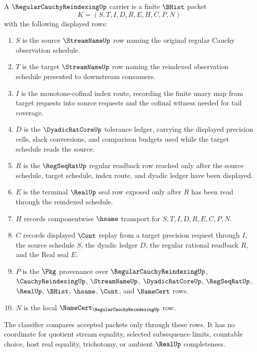 \begin{definition}
\label{def:regular-cauchy-reindexing-carrier}
A $\RegularCauchyReindexingUp$ carrier is a finite $\BHist$ packet
$$
K=(S,T,I,D,R,E,H,C,P,N)
$$
with the following displayed rows:
\begin{enumerate}
\item $S$ is the source $\StreamNameUp$ row naming the original regular Cauchy observation schedule.
\item $T$ is the target $\StreamNameUp$ row naming the reindexed observation schedule presented to downstream consumers.
\item $I$ is the monotone-cofinal index route, recording the finite unary map from target requests into source requests and the cofinal witness needed for tail coverage.
\item $D$ is the $\DyadicRatCoreUp$ tolerance ledger, carrying the displayed precision cells, slack conversions, and comparison budgets used while the target schedule reads the source.
\item $R$ is the $\RegSeqRatUp$ regular readback row reached only after the source schedule, target schedule, index route, and dyadic ledger have been displayed.
\item $E$ is the terminal $\RealUp$ seal row exposed only after $R$ has been read through the reindexed schedule.
\item $H$ records componentwise $\hsame$ transport for $S,T,I,D,R,E,C,P,N$.
\item $C$ records displayed $\Cont$ replay from a target precision request through $I$, the source schedule $S$, the dyadic ledger $D$, the regular rational readback $R$, and the Real seal $E$.
\item $P$ is the $\Pkg$ provenance over $\RegularCauchyReindexingUp$, $\CauchyReindexingUp$, $\StreamNameUp$, $\DyadicRatCoreUp$, $\RegSeqRatUp$, $\RealUp$, $\BHist$, $\hsame$, $\Cont$, and $\NameCert$ rows.
\item $N$ is the local $\NameCert_{\RegularCauchyReindexingUp}$ row.
\end{enumerate}
The classifier compares accepted packets only through these rows. It has no coordinate for quotient stream equality, selected subsequence limits, countable choice, host real equality, trichotomy, or ambient $\RealUp$ completeness.
\end{definition}

